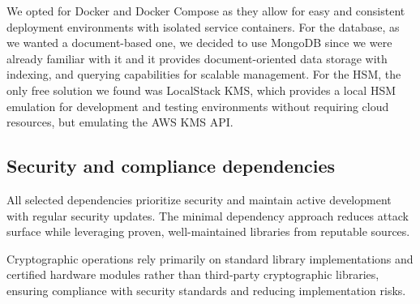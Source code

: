 We opted for Docker and Docker Compose as they allow for easy and consistent deployment 
environments with isolated service containers. For the database, as we wanted a document-based one,
we decided to use MongoDB since we were already familiar with it and it provides document-oriented 
data storage with indexing, and querying capabilities for scalable management.
For the HSM, the only free solution we found was LocalStack KMS, which provides a local HSM emulation
for development and testing environments without requiring cloud resources, but emulating the AWS KMS API.

\subsection{Security and compliance dependencies}

All selected dependencies prioritize security and maintain active development 
with regular security updates. The minimal dependency approach reduces attack 
surface while leveraging proven, well-maintained libraries from reputable sources. 

Cryptographic operations rely primarily on standard library implementations 
and certified hardware modules rather than third-party cryptographic libraries, 
ensuring compliance with security standards and reducing implementation risks.